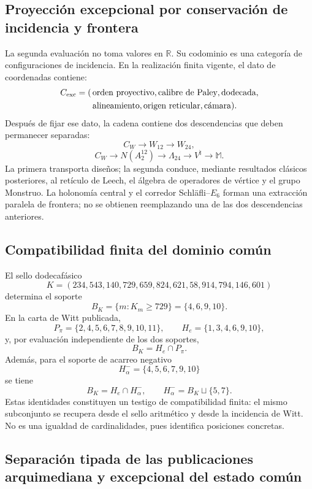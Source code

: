 \subsection{Proyección excepcional por conservación de incidencia y frontera}

La segunda evaluación no toma valores en \(\mathbb R\). Su codominio es una
categoría de configuraciones de incidencia. En la realización finita vigente,
el dato de coordenadas contiene:
\[
 \begin{aligned}
 C_{\rm exc}=(\,&\text{orden proyectivo},\text{calibre de Paley},
 \text{dodecada},\\
 &\text{alineamiento},\text{origen reticular},\text{cámara}).
 \end{aligned}
\]
Después de fijar ese dato, la cadena contiene dos descendencias que deben
permanecer separadas:
\[
 C_W\longrightarrow W_{12}\longrightarrow W_{24},
\]
\[
 C_W\longrightarrow N(A_2^{12})
 \longrightarrow\Lambda_{24}
 \longrightarrow V^\natural
 \longrightarrow\mathbb M.
\]
La primera transporta diseños; la segunda conduce, mediante resultados
clásicos posteriores, al retículo de Leech, el álgebra de operadores de
vértice y el grupo Monstruo. La holonomía central y el corredor
Schläfli--\(E_6\) forman una extracción paralela de frontera; no se obtienen
reemplazando una de las dos descendencias anteriores.

\subsection{Compatibilidad finita del dominio común}

El sello dodecafásico
\[
 K=(234,543,140,729,659,824,621,58,914,794,146,601)
\]
determina el soporte
\[
 B_K=\{m:K_m\geq729\}=\{4,6,9,10\}.
\]
En la carta de Witt publicada,
\[
 P_\pi=\{2,4,5,6,7,8,9,10,11\},
 \qquad
 H_e=\{1,3,4,6,9,10\},
\]
y, por evaluación independiente de los dos soportes,
\[
 \boxed{B_K=H_e\cap P_\pi.}
\]
Además, para el soporte de acarreo negativo
\[
 H_\alpha^-=\{4,5,6,7,9,10\}
\]
se tiene
\[
 B_K=H_e\cap H_\alpha^-,
 \qquad H_\alpha^-=B_K\sqcup\{5,7\}.
\]
Estas identidades constituyen un testigo de compatibilidad finita: el mismo
subconjunto se recupera desde el sello aritmético y desde la incidencia de
Witt. No es una igualdad de cardinalidades, pues identifica posiciones
concretas.

\subsection{Separación tipada de las publicaciones arquimediana y excepcional del estado común}

